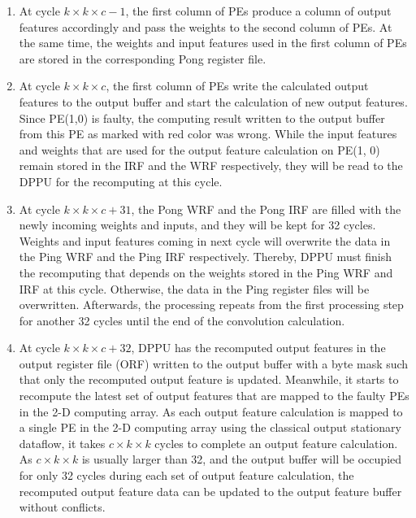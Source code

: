 \begin{enumerate}
    \item At cycle $k\times k\times c - 1$, the first column of PEs produce a column of output features accordingly and pass the weights to the second column of PEs. At the same time, the weights and input features used in the first column of PEs are stored in the corresponding Pong register file.

    \item At cycle $ k\times k\times c $, the first column of PEs write the calculated output features to the output buffer and start the calculation of new output features. Since PE(1,0) is faulty, the computing result written to the output buffer from this PE as marked with red color was wrong. While the input features and weights that are used for the output feature calculation on PE(1, 0) remain stored in the IRF and the WRF respectively, they will be read to the DPPU for the recomputing at this cycle. 

    \item At cycle $ k\times k\times c + 31$, the Pong WRF and the Pong IRF are filled with the newly incoming weights and inputs, and they will be kept for 32 cycles. Weights and input features coming in next cycle will overwrite the data in the Ping WRF and the Ping IRF respectively. Thereby, DPPU must finish the recomputing that depends on the weights stored in the Ping WRF and IRF at this cycle. Otherwise, the data in the Ping register files will be overwritten. Afterwards, the processing repeats from the first processing step for another 32 cycles until the end of the convolution calculation.

    \item At cycle $ k\times k\times c + 32$, DPPU has the recomputed output features in the output register file (ORF) written to the output buffer with a byte mask such that only the recomputed output feature is updated. Meanwhile, it starts to recompute the latest set of output features that are mapped to the faulty PEs in the 2-D computing array. As each output feature calculation is mapped to a single PE in the 2-D computing array using the classical output stationary dataflow, it takes $c \times k \times k$ cycles to complete an output feature calculation. As $c \times k \times k$ is usually larger than 32, and the output buffer will be occupied for only 32 cycles during each set of output feature calculation, the recomputed output feature data can be updated to the output feature buffer without conflicts. %


\end{enumerate}
